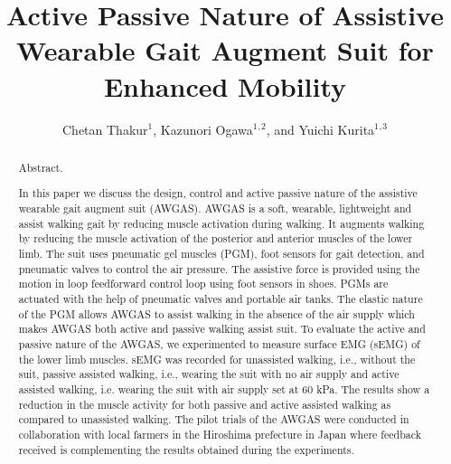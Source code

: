 \documentclass[paper,JRM,paper]{jaciiiarticle}
\begin{document}
\pagestyle{jaciiistyle}

\title{Active Passive Nature of Assistive Wearable Gait Augment Suit for Enhanced Mobility}

\author{Chetan Thakur$^1$, Kazunori Ogawa$^1$$^,$$^2$, and Yuichi Kurita$^1$$^,$$^3$}
\address{$^1$Hiroshima University, Hiroshima, Japan\\
		 $^2$ Daiya Industries Co, Ltd. Okayama, Japan\\
		 $^3$ JST PRESTO, Saitama, Japan\\
         E-mail: chetanthakur@hiroshima-u.ac.jp}
\maketitle

\begin{abstract}%
\noindent Abstract. %

In this paper we discuss the design, control and active passive nature of the assistive wearable gait augment suit (AWGAS).  AWGAS is a soft, wearable, lightweight and assist walking gait by reducing muscle activation during walking. It augments walking by reducing the muscle activation of the posterior and anterior muscles of the lower limb. The suit uses pneumatic gel muscles (PGM), foot sensors for gait detection, and pneumatic valves to control the air pressure. The assistive force is provided using the motion in loop feedforward control loop using  foot sensors in shoes. PGMs are actuated with the help of pneumatic valves and portable air tanks. The elastic nature of the PGM allows AWGAS to assist walking in the absence of the air supply which makes AWGAS both active and passive walking assist suit. To evaluate the active and passive nature of the AWGAS, we experimented to measure surface EMG (sEMG) of the lower limb muscles. sEMG was recorded for unassisted walking, i.e., without the suit, passive assisted walking, i.e., wearing the suit with no air supply and active assisted walking, i.e. wearing the suit with air supply set at 60 kPa.  The results show a reduction in the muscle activity for both passive and active assisted walking as compared to unassisted walking. The pilot trials of the AWGAS were conducted in collaboration with local farmers in the Hiroshima prefecture in Japan where feedback received is complementing the results obtained during the experiments.

\end{abstract}
\end{document}
